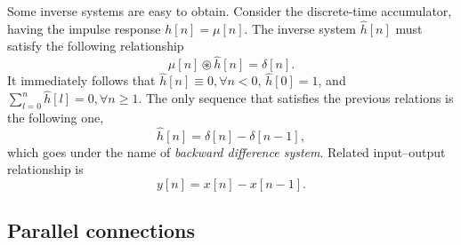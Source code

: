 \documentclass[\documentfontsize, twocolumn]{\classname}
\begin{document}
\begin{center}
\end{center}

Some inverse systems are easy to obtain. Consider the discrete-time accumulator, having the impulse response $h[n] = \mu[n]$. The inverse system $\hat h[n]$ must satisfy the following relationship \[\mu[n] \circledast \hat h[n] = \delta[n].\] It immediately follows that $\hat h[n] \equiv 0, \forall n<0$, $\hat h[0] = 1$, and $\sum_{l=0}^n \hat h[l] = 0, \forall n \geq 1$. The only sequence that satisfies the previous relations is the following one,
\begin{equation}\label{eqn:backwardDifferenceSystem}
    \hat h[n] = \delta[n] - \delta[n-1],
\end{equation}
which goes under the name of \emph{backward difference system}. Related input--output relationship is
\[
    y[n] = x[n] - x[n-1].
\]

\subsection{Parallel connections}
\end{document}
